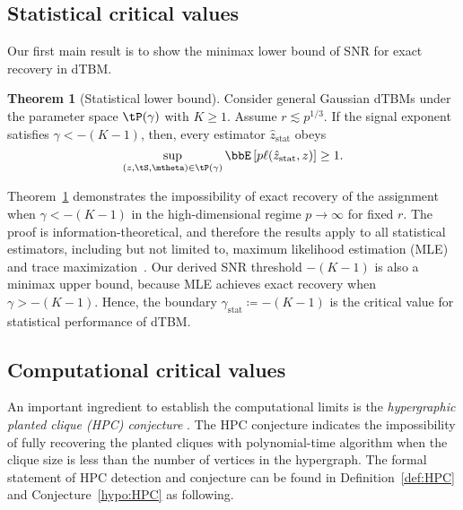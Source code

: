\documentclass[lettersize,onecolumn,journal]{IEEEtran}
\theoremstyle{definition}
\newtheorem{thm}{Theorem}
\theoremstyle{definition}
\def\fixme#1#2{\textbf{\color{red}[FIXME (#1): #2]}}
\begin{document}
\subsection{Statistical critical values}\label{sec:statlimit}
Our first main result is to show the minimax lower bound of SNR for exact recovery in dTBM. 
\begin{thm}[Statistical lower bound]\label{thm:stats} Consider general Gaussian dTBMs under the parameter space $\tP(\gamma)$ with $K\geq 1$. Assume $r \lesssim p^{1/3}$. If the signal exponent satisfies $\gamma < -(K-1)$, then, every estimator $\hat z_{\text{stat}}$ obeys
\begin{equation}
    \sup_{(z, \tS, \mtheta) \in \tP(\gamma)} \bbE \left[ p\ell(\hat z_{\text{stat}}, z) \right]\geq 1.
\end{equation}
\end{thm}
Theorem~\ref{thm:stats} demonstrates the impossibility of exact recovery of the assignment when $\gamma < -(K-1)$ in the high-dimensional regime $p\to \infty$ for fixed $r$. The proof is information-theoretical, and therefore the results apply to all statistical estimators, including but not limited to, maximum likelihood estimation (MLE)~\citep{wang2019multiway} and trace maximization~\citep{ghoshdastidar2017uniform}. Our derived SNR threshold $-(K-1)$ is also a minimax upper bound, because MLE achieves exact recovery when $\gamma > -(K-1)$. Hence, the boundary $\gamma_{\text{stat}} \coloneqq -(K-1)$ is the  critical value for statistical performance of dTBM. 


\subsection{Computational critical values}\label{sec:complimit}
An important ingredient to establish the computational limits is the \emph{hypergraphic planted clique (HPC) conjecture} \citep{zhang2018tensor, brennan2020reducibility}. The HPC conjecture indicates the impossibility of fully recovering the planted cliques with polynomial-time algorithm when the clique size is less than the number of vertices in the hypergraph.
The formal statement of HPC detection and conjecture can be found in Definition~\ref{def:HPC} and Conjecture~\ref{hypo:HPC} as following.  
\end{document}
